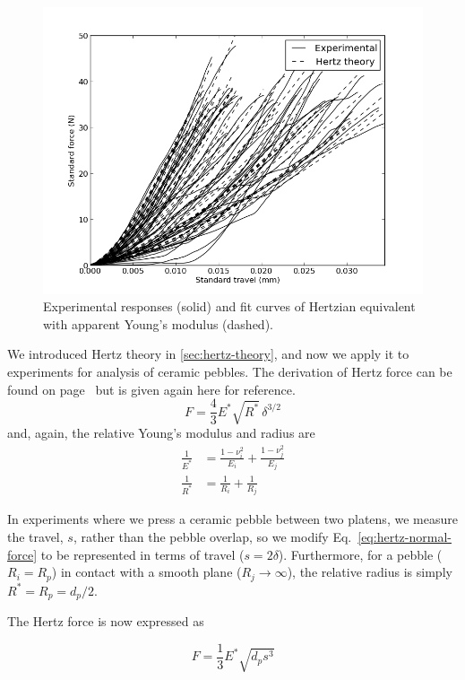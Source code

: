 \begin{figure}[t]
  \centering
  \includegraphics[width = 0.75 \textwidth]{chapters/figures/NFRI-exp_v_hertz}
  \caption{Experimental responses (solid) and fit curves of Hertzian equivalent with apparent Young's modulus (dashed).}\label{fig:hertz-exp}
\end{figure}






We introduced Hertz theory in \cref{sec:hertz-theory}, and now we apply it to experiments for analysis of ceramic pebbles. The derivation of Hertz force can be found on page~\pageref{eq:hertz-normal-force} but is given again here for reference.
\begin{equation}
        F = \frac{4}{3}E^*\sqrt{R^*}\,\delta^{3/2}
\end{equation}
and, again, the relative Young's modulus and radius are
\begin{align*}
\frac{1}{E^*} & = \frac{1-\nu_i^2}{E_i} + \frac{1-\nu_j^2}{E_j} \\
\frac{1}{R^*} & = \frac{1}{R_i} + \frac{1}{R_j}
\end{align*}

In experiments where we press a ceramic pebble between two platens, we measure the travel, $s$, rather than the pebble overlap, so we modify Eq.~\ref{eq:hertz-normal-force} to be represented in terms of travel ($s = 2\delta$). Furthermore, for a pebble ($R_i = R_p$) in contact with a smooth plane ($R_j \rightarrow \infty$), the relative radius is simply $R^* = R_p = d_p/2$.

The Hertz force is now expressed as

\begin{equation}\label{eq:contact-force}
        F = \frac{1}{3}E^*\sqrt{d_ps^3}
\end{equation}

